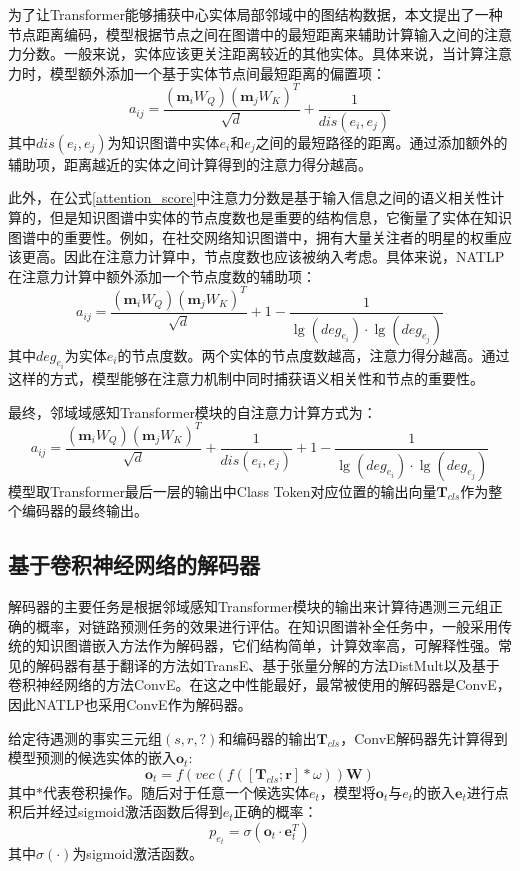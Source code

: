 为了让Transformer能够捕获中心实体局部邻域中的图结构数据，本文提出了一种节点距离编码，模型根据节点之间在图谱中的最短距离来辅助计算输入之间的注意力分数。一般来说，实体应该更关注距离较近的其他实体。具体来说，当计算注意力时，模型额外添加一个基于实体节点间最短距离的偏置项：
\begin{equation}
  a_{ij}=\frac{(\boldsymbol{m}_iW_Q)(\boldsymbol{m}_jW_K)^T}{\sqrt{d}}+\frac{1}{dis(e_i,e_j)}
\end{equation}
其中$dis(e_i,e_j)$为知识图谱中实体$e_i$和$e_j$之间的最短路径的距离。通过添加额外的辅助项，距离越近的实体之间计算得到的注意力得分越高。

此外，在公式\ref{attention_score}中注意力分数是基于输入信息之间的语义相关性计算的，但是知识图谱中实体的节点度数也是重要的结构信息，它衡量了实体在知识图谱中的重要性。例如，在社交网络知识图谱中，拥有大量关注者的明星的权重应该更高。因此在注意力计算中，节点度数也应该被纳入考虑。具体来说，NATLP在注意力计算中额外添加一个节点度数的辅助项：
\begin{equation}
  a_{ij}=\frac{(\boldsymbol{m}_iW_Q)(\boldsymbol{m}_jW_K)^T}{\sqrt{d}}+1-\frac{1}{\lg (deg_{e_i})\cdot \lg (deg_{e_j})}
\end{equation}
其中$deg_{e_i}$为实体$e_i$的节点度数。两个实体的节点度数越高，注意力得分越高。通过这样的方式，模型能够在注意力机制中同时捕获语义相关性和节点的重要性。

最终，邻域域感知Transformer模块的自注意力计算方式为：
\begin{equation}
  a_{ij}=\frac{(\boldsymbol{m}_iW_Q)(\boldsymbol{m}_jW_K)^T}{\sqrt{d}}+\frac{1}{dis(e_i,e_j)}+1-\frac{1}{\lg (deg_{e_i})\cdot \lg (deg_{e_j})}
\end{equation}
模型取Transformer最后一层的输出中Class Token对应位置的输出向量$\boldsymbol{T}_{cls}$作为整个编码器的最终输出。


\subsection{基于卷积神经网络的解码器}

解码器的主要任务是根据邻域感知Transformer模块的输出来计算待遇测三元组正确的概率，对链路预测任务的效果进行评估。在知识图谱补全任务中，一般采用传统的知识图谱嵌入方法作为解码器，它们结构简单，计算效率高，可解释性强。常见的解码器有基于翻译的方法如TransE、基于张量分解的方法DistMult以及基于卷积神经网络的方法ConvE。在这之中性能最好，最常被使用的解码器是ConvE，因此NATLP也采用ConvE作为解码器。

给定待遇测的事实三元组$(s,r,?)$和编码器的输出$\boldsymbol{T}_{cls}$，ConvE解码器先计算得到模型预测的候选实体的嵌入$\boldsymbol{o}_{t}$:
\begin{equation}
  \boldsymbol{o}_{t}=f\left(vec\left(f\left(\left[\boldsymbol{T}_{cls};\boldsymbol{r}\right]\ast \omega\right)\right)\mathbf{W}\right)
\end{equation}
其中$\ast$代表卷积操作。随后对于任意一个候选实体$e_t$，模型将$\boldsymbol{o}_{t}$与$e_t$的嵌入$\boldsymbol{e}_{t}$进行点积后并经过sigmoid激活函数后得到$e_t$正确的概率：
\begin{equation}
  p_{e_t} = \sigma(\boldsymbol{o}_{t}\cdot \boldsymbol{e}_{t}^T)
\end{equation}
其中$\sigma(\cdot)$为sigmoid激活函数。

